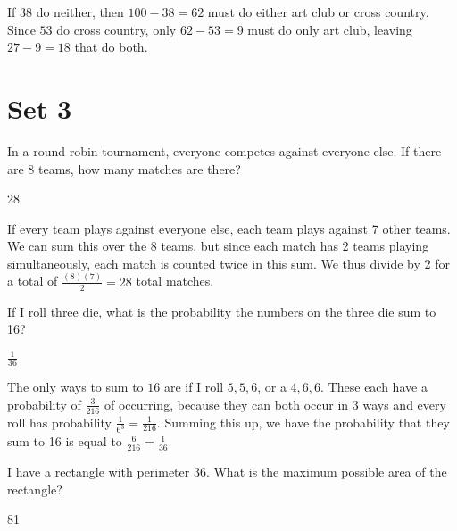 \documentclass[11pt]{article}
\begin{document}
\begin{solution}
If 38 do neither, then $100-38=62$ must do either art club or cross country. Since $53$ do cross country, only $62-53=9$ must do only art club, leaving $27-9=\boxed{18}$ that do both.
\end{solution}

\newpage
\section*{Set 3}
\begin{problem}
In a round robin tournament, everyone competes against everyone else. If there are 8 teams, how many matches are there?
\end{problem}

\begin{answer}
28
\end{answer}

\begin{solution}
If every team plays against everyone else, each team plays against 7 other teams. We can sum this over the 8 teams, but since each match has 2 teams playing simultaneously, each match is counted twice in this sum.  We thus divide by 2 for a total of $\frac{(8)(7)}{2}=\boxed{28}$ total matches.
\end{solution}

\begin{problem}
If I roll three die, what is the probability the numbers on the three die sum to 16?
\end{problem}

\begin{answer}
$\frac{1}{36}$
\end{answer}

\begin{solution}
The only ways to sum to $16$ are if I roll $5, 5, 6$, or a $4, 6, 6$. These each have a probability of $\frac{3}{216}$ of occurring, because they can both occur in 3 ways and every roll has probability $\frac{1}{6^3}=\frac{1}{216}$. Summing this up, we have the probability that they sum to 16 is equal to $\frac{6}{216} = \boxed{\frac{1}{36}}$
\end{solution}

\begin{problem}
I have a rectangle with perimeter 36. What is the maximum possible area of the rectangle?
\end{problem}

\begin{answer}
81
\end{answer}
\end{document}
